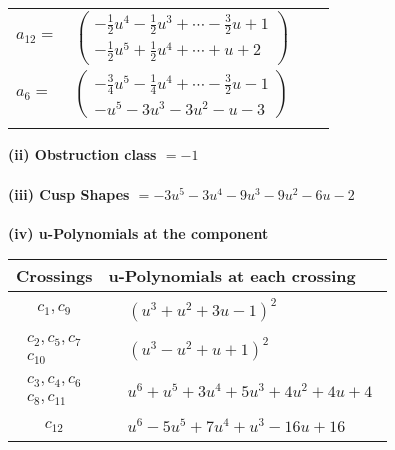 \documentclass[1p]{elsarticle_modified}
\theoremstyle{definition}
\begin{document}
\begin{tabular}{m{7pt} m{180pt} m{7pt} m{180pt} }
\flushright $a_{12}=$&$\begin{pmatrix}-\frac{1}{2} u^4-\frac{1}{2} u^3+\cdots-\frac{3}{2} u+1\\-\frac{1}{2} u^5+\frac{1}{2} u^4+\cdots+u+2\end{pmatrix}$ \\
\flushright $a_{6}=$&$\begin{pmatrix}-\frac{3}{4} u^5-\frac{1}{4} u^4+\cdots-\frac{3}{2} u-1\\- u^5-3 u^3-3 u^2- u-3\end{pmatrix}$\\&\end{tabular}
\flushleft \textbf{(ii) Obstruction class $= -1$}\\~\\
\flushleft \textbf{(iii) Cusp Shapes $= -3 u^5-3 u^4-9 u^3-9 u^2-6 u-2$}\\~\\
\newpage\renewcommand{\arraystretch}{1}
\flushleft \textbf{(iv) u-Polynomials at the component}\newline \\
\begin{tabular}{m{50pt}|m{274pt}}
Crossings & \hspace{64pt}u-Polynomials at each crossing \\
\hline $$\begin{aligned}c_{1},c_{9}\end{aligned}$$&$\begin{aligned}
&(u^3+u^2+3 u-1)^2
\end{aligned}$\\
\hline $$\begin{aligned}c_{2},c_{5},c_{7}\\c_{10}\end{aligned}$$&$\begin{aligned}
&(u^3- u^2+u+1)^2
\end{aligned}$\\
\hline $$\begin{aligned}c_{3},c_{4},c_{6}\\c_{8},c_{11}\end{aligned}$$&$\begin{aligned}
&u^6+u^5+3 u^4+5 u^3+4 u^2+4 u+4
\end{aligned}$\\
\hline $$\begin{aligned}c_{12}\end{aligned}$$&$\begin{aligned}
&u^6-5 u^5+7 u^4+u^3-16 u+16
\end{aligned}$\\
\hline
\end{tabular}\\~\\
\end{document}
